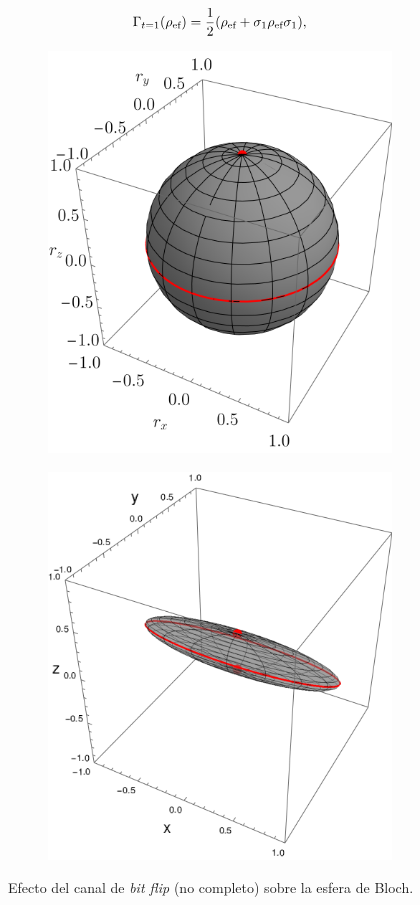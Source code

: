 \begin{equation}
  \Gamma_{t=1}(\rho_{\text{ef}})=\frac{1}{2}\qty(\rho_{\text{ef}}+\sigma_{1}\rho_{\text{ef}}\sigma_{1}),\nonumber
\end{equation}
\begin{figure}[ht!]
  \centering
  \begin{subfigure}{0.5\textwidth}
    \centering
    \includegraphics[width=0.6\linewidth]{chapter3/figures_toy/SWAP_t=0._p=0.9_r=0.9.png}
  \end{subfigure}%
  \begin{subfigure}{0.5\textwidth}
    \centering
    \includegraphics[width=0.6\linewidth]{chapter3/figures_toy/sphere_BitF_t=1.0_z=0.8_p=0.6.png}
  \end{subfigure}
  \caption{Efecto del canal de \textit{bit flip} (no completo) sobre la esfera de Bloch.}\label{fig:BitFlip}
\end{figure}
